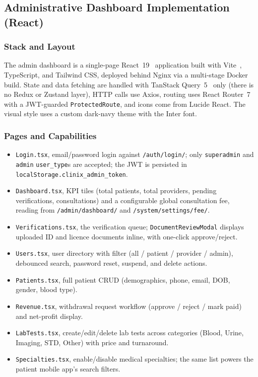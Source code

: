 \subsection{Administrative Dashboard Implementation (React)}

\subsubsection*{Stack and Layout}

The admin dashboard is a single-page React~19~\cite{react_docs} application built with Vite~\cite{vite_docs}, TypeScript, and Tailwind CSS, deployed behind Nginx via a multi-stage Docker build. State and data fetching are handled with TanStack Query~5~\cite{tanstack_query} only (there is no Redux or Zustand layer), HTTP calls use Axios, routing uses React Router~7 with a JWT-guarded \texttt{ProtectedRoute}, and icons come from Lucide React. The visual style uses a custom dark-navy theme with the Inter font.

\subsubsection*{Pages and Capabilities}

\begin{itemize}
  \item \texttt{Login.tsx}, email/password login against \texttt{/auth/login/}; only \texttt{superadmin} and \texttt{admin} \texttt{user\_type}s are accepted; the JWT is persisted in \texttt{localStorage.clinix\_admin\_token}.
  \item \texttt{Dashboard.tsx}, KPI tiles (total patients, total providers, pending verifications, consultations) and a configurable global consultation fee, reading from \texttt{/admin/dashboard/} and \texttt{/system/settings/fee/}.
  \item \texttt{Verifications.tsx}, the verification queue; \texttt{DocumentReviewModal} displays uploaded ID and licence documents inline, with one-click approve/reject.
  \item \texttt{Users.tsx}, user directory with filter (all / patient / provider / admin), debounced search, password reset, suspend, and delete actions.
  \item \texttt{Patients.tsx}, full patient CRUD (demographics, phone, email, DOB, gender, blood type).
  \item \texttt{Revenue.tsx}, withdrawal request workflow (approve / reject / mark paid) and net-profit display.
  \item \texttt{LabTests.tsx}, create/edit/delete lab tests across categories (Blood, Urine, Imaging, STD, Other) with price and turnaround.
  \item \texttt{Specialties.tsx}, enable/disable medical specialties; the same list powers the patient mobile app's search filters.
\end{itemize}

